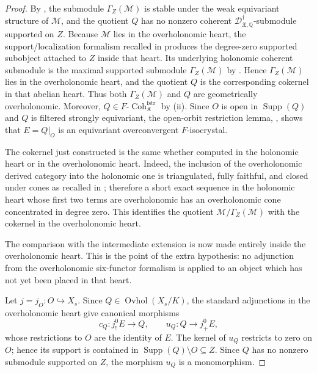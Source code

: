 \documentclass[11pt]{amsart}
\theoremstyle{plain}
\theoremstyle{definition}
\theoremstyle{remark}
\newcommand{\Ovhol}{\operatorname{Ovhol}}
\newcommand{\Coh}{\operatorname{Coh}}
\newcommand{\Supp}{\operatorname{Supp}}
\newcommand{\fstr}{\mathrm{fstr}}
\begin{document}
\begin{proof}
By , the submodule
\(\Gamma_Z(\mathcal M)\) is stable under the weak equivariant structure of
\(\mathcal M\), and the quotient \(Q\) has no nonzero coherent
\(\mathscr D^\dagger_{\mathfrak X,\mathbb Q}\)-submodule supported on \(Z\).
Because \(\mathcal M\) lies in the overholonomic heart, the support/localization
formalism recalled in  produces the degree-zero
supported subobject attached to \(Z\) inside that heart.  Its underlying
holonomic coherent submodule is the maximal supported submodule
\(\Gamma_Z(\mathcal M)\) by .  Hence
\(\Gamma_Z(\mathcal M)\) lies in the overholonomic heart, and the quotient
\(Q\) is the corresponding cokernel in that abelian heart.  Thus both
\(\Gamma_Z(\mathcal M)\) and \(Q\) are geometrically overholonomic.  Moreover,
\(Q\in F\text{-}\Coh^{\fstr}_{\mathfrak K}\) by
\textup{(ii)}.  Since \(O\) is open in
\(\Supp(Q)\) and \(Q\) is filtered strongly equivariant, the open-orbit
restriction lemma, , shows that
\(E=Q|_O\) is an equivariant overconvergent \(F\)-isocrystal.

The cokernel just constructed is the same whether computed in the holonomic
heart or in the overholonomic heart.  Indeed, the inclusion of the
overholonomic derived category into the holonomic one is triangulated, fully
faithful, and closed under cones as recalled in ;
therefore a short exact sequence in the holonomic heart whose first two terms
are overholonomic has an overholonomic cone concentrated in degree zero.  This
identifies the quotient \(\mathcal M/\Gamma_Z(\mathcal M)\) with the cokernel in
the overholonomic heart.

The comparison with the intermediate extension is now made entirely inside the
overholonomic heart.  This is the point of the extra hypothesis: no
adjunction from the overholonomic six-functor formalism is applied to an object
which has not yet been placed in that heart.

Let \(j=j_O:O\hookrightarrow X_s\).  Since \(Q\in\Ovhol(X_s/K)\), the standard
adjunctions in the overholonomic heart give canonical morphisms
\[
  c_Q:j^0_!E\longrightarrow Q,
  \qquad
  u_Q:Q\longrightarrow j^0_+E,
\]
whose restrictions to \(O\) are the identity of \(E\).  The kernel of \(u_Q\)
restricts to zero on \(O\); hence its support is contained in
\(\Supp(Q)\setminus O\subseteq Z\).  Since \(Q\) has no nonzero submodule
supported on \(Z\), the morphism \(u_Q\) is a monomorphism.


\end{proof}
\end{document}
